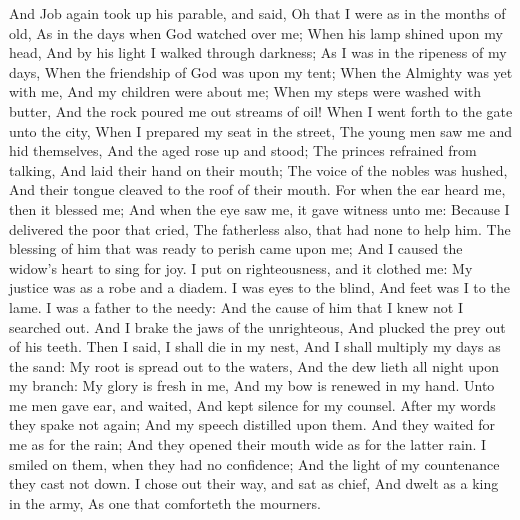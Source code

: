 And Job again took up his parable, and said,  Oh that I were as in the months of old, As in the days when God watched over me;  When his lamp shined upon my head, And by his light I walked through darkness;  As I was in the ripeness of my days, When the friendship of God was upon my tent;  When the Almighty was yet with me, And my children were about me;  When my steps were washed with butter, And the rock poured me out streams of oil!  When I went forth to the gate unto the city, When I prepared my seat in the street,  The young men saw me and hid themselves, And the aged rose up and stood;  The princes refrained from talking, And laid their hand on their mouth;  The voice of the nobles was hushed, And their tongue cleaved to the roof of their mouth.  For when the ear heard me, then it blessed me; And when the eye saw me, it gave witness unto me:  Because I delivered the poor that cried, The fatherless also, that had none to help him.  The blessing of him that was ready to perish came upon me; And I caused the widow’s heart to sing for joy.  I put on righteousness, and it clothed me: My justice was as a robe and a diadem.  I was eyes to the blind, And feet was I to the lame.  I was a father to the needy: And the cause of him that I knew not I searched out.  And I brake the jaws of the unrighteous, And plucked the prey out of his teeth.  Then I said, I shall die in my nest, And I shall multiply my days as the sand:  My root is spread out to the waters, And the dew lieth all night upon my branch:  My glory is fresh in me, And my bow is renewed in my hand.  Unto me men gave ear, and waited, And kept silence for my counsel.  After my words they spake not again; And my speech distilled upon them.  And they waited for me as for the rain; And they opened their mouth wide as for the latter rain.  I smiled on them, when they had no confidence; And the light of my countenance they cast not down.  I chose out their way, and sat as chief, And dwelt as a king in the army, As one that comforteth the mourners. 

